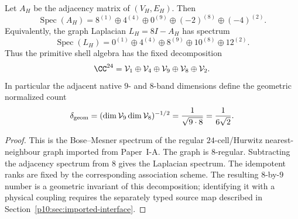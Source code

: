 \documentclass[12pt,a4paper]{article}
\providecommand{\deltageom}{\delta_{\rm geom}}
\begin{document}
\begin{theorem}
\label{p10:thm:hurwitz-shell-adjacency-spectrum}
Let \(A_H\) be the adjacency matrix of \((V_H,E_H)\).  Then
\begin{equation}
\label{p10:eq:hurwitz-adjacency-spectrum}
\operatorname{Spec}(A_H)=
8^{(1)}\oplus4^{(4)}\oplus0^{(9)}\oplus(-2)^{(8)}\oplus(-4)^{(2)}.
\end{equation}
Equivalently, the graph Laplacian \(L_H=8I-A_H\) has spectrum
\begin{equation}
\label{p10:eq:hurwitz-laplacian-spectrum}
\operatorname{Spec}(L_H)=
0^{(1)}\oplus4^{(4)}\oplus8^{(9)}\oplus10^{(8)}\oplus12^{(2)}.
\end{equation}
Thus the primitive shell algebra has the fixed decomposition
\begin{equation}
\label{p10:eq:hurwitz-shell-band-decomposition}
\CC^{24}=\mathcal V_1\oplus\mathcal V_4\oplus\mathcal V_9\oplus\mathcal V_8\oplus\mathcal V_2.
\end{equation}
In particular the adjacent native \(9\)- and \(8\)-band dimensions define the geometric normalized count
\begin{equation}
\label{p10:eq:delta-from-hurwitz-eight-nine-bands}
\deltageom=(\dim\mathcal V_9\dim\mathcal V_8)^{-1/2}=\frac1{\sqrt{9\cdot8}}=\frac1{6\sqrt2}.
\end{equation}
\end{theorem}
\begin{proof}
This is the Bose--Mesner spectrum of the regular \(24\)-cell/Hurwitz nearest-neighbour graph imported from Paper~I-A.  The graph is \(8\)-regular.  Subtracting the adjacency spectrum from \(8\) gives the Laplacian spectrum.  The idempotent ranks are fixed by the corresponding association scheme.  The resulting \(8\)-by-\(9\) number is a geometric invariant of this decomposition; identifying it with a physical coupling requires the separately typed source map described in Section~\ref{p10:sec:imported-interface}.
\end{proof}
\end{document}
